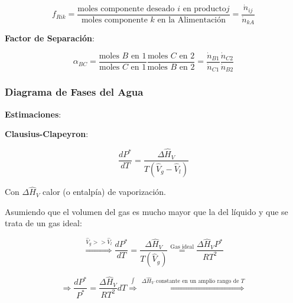             \begin{equation}
            \label{eq:recuperacion_fraccionaria}
                f_{Rik} = \frac{\text{moles componente deseado }i\text{ en producto} j}{\text{moles componente }k\text{ en la Alimentación}} = \frac{\dot{n}_{ij}}{\dot{n}_{kA}}
            \end{equation}
            
            \textbf{Factor de Separación}:
            
            \begin{equation}
            \label{eq:factor_separacion}
                \alpha_{BC} = \frac{\text{moles }B\text{ en }1}{\text{moles }C\text{ en }1} \frac{\text{moles }C\text{ en }2}{\text{moles }B\text{ en }2} = \frac{\dot{n}_{B1}}{\dot{n}_{C1}} \frac{\dot{n}_{C2}}{\dot{n}_{B2}}
            \end{equation}
        
        \subsubsection{Diagrama de Fases del Agua}
        
            
            \begin{quote}
                \textit{}
            \end{quote}
            
            \textbf{Estimaciones}:
            
            \textbf{Clausius-Clapeyron}:
            
            \[\frac{dP^{*}}{dT} = \frac{\Delta \widehat{H}_{V}}{T \left ( \widehat{V}_{g} - \widehat{V}_{l} \right )}\]
            
            Con \(\Delta \widehat{H}_{V}\) calor (o entalpía) de vaporización.
            
            Asumiendo que el volumen del gas es mucho mayor que la del líquido y que se trata de un gas ideal:
            
            \[\overset{\widehat{V}_{g} >> \widehat{V}_{l}}{\Rightarrow} \frac{dP^{*}}{dT} = \frac{\Delta \widehat{H}_{V}}{T \left ( \widehat{V}_{g} \right )} \overset{\text{Gas ideal}}{=} \frac{\Delta \widehat{H}_{V} P^{*}}{RT^{2}}\]
            
            \[\Rightarrow \frac{dP^{*}}{P^{*}} = \frac{\Delta \widehat{H}_{V}}{RT^{2}}dT \overset{\int{}}{\Rightarrow} \overset{\Delta \widehat{H}_{V}\text{ constante en un amplio rango de }T}{\Rightarrow}\]
            
